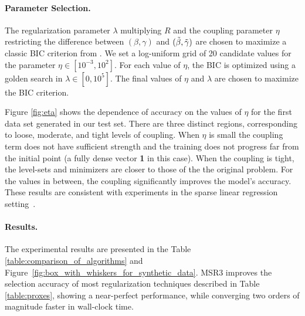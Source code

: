 	
\paragraph{Parameter Selection.} The regularization parameter $\lambda$ 
multiplying $R$ and the 
coupling parameter $\eta$ restricting the difference between 
$(\beta,\gamma)$ and $(\tilde\beta,{\tilde{\gamma}})$ are chosen to maximize a classic 
BIC criterion from \cite{Jones2011}. 
We set a log-uniform grid of 20 candidate values for the parameter $\eta \in [10^{-3}, 10^2]$. For each value of $\eta$,
the BIC is optimized using a golden search in $\lambda \in [0, 10^5]$. The final values of $\eta$ and $\lambda$ are  chosen
to maximize the BIC criterion.
	
	Figure \ref{fig:eta} shows the dependence of accuracy on the values of $\eta$ for the first data set generated in our test set. There are three distinct regions, corresponding to loose, moderate, and tight levels of coupling. When $\eta$ is small the coupling term does not have sufficient strength and the training does not progress far from the initial point (a fully dense vector \textbf{1} in this case). When the coupling is tight, the level-sets and minimizers are closer to those of the the original problem. For the values in between, the coupling significantly improves the model's accuracy. 
These results are consistent with experiments in the sparse linear regression setting~\cite{Zheng2019SR3}. 

\paragraph{Results.}
The experimental results are presented in the Table \ref{table:comparison_of_algorithms} and Figure~\ref{fig:box_with_whiskers_for_synthetic_data}. MSR3 improves the selection accuracy of most regularization techniques 
described in Table \ref{table:proxes}, showing a near-perfect performance, while converging two orders of magnitude faster in wall-clock time. 

